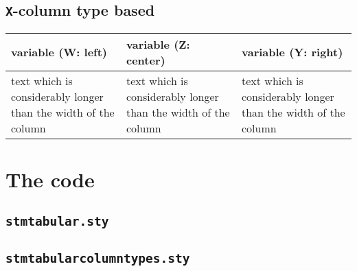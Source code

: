 \documentclass[%
  type=article,%
  layout=koma,%
  date=true,%
  hyperref=true,%
  listings=true,%
  math=true,%
]{stmtext}
\begin{document}
\subsection{\protect\texttt{X}-column type based}

\begin{table}[htbp]
\begin{tabularx}{\textwidth}{WZY}
\toprule
variable (W: left)   &
variable (Z: center) &
variable (Y: right)  \\
\midrule
%
text which is considerably longer than the width of the column &
text which is considerably longer than the width of the column &
text which is considerably longer than the width of the column \\
\bottomrule
\end{tabularx}
\end{table}

\newpage

\appendix

\newpage
\section{The code}

\subsection{\protect\texttt{stmtabular.sty}}



\subsection{\protect\texttt{stmtabularcolumntypes.sty}}


\end{document}
